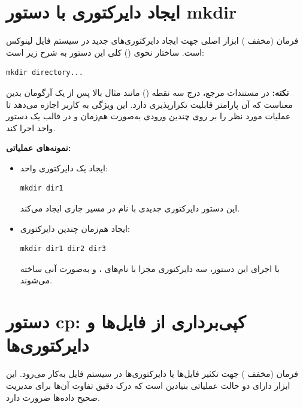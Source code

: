 \section{ایجاد دایرکتوری با دستور mkdir}

فرمان  (مخفف ) ابزار اصلی جهت ایجاد دایرکتوری‌های جدید در سیستم‌ فایل لینوکس است. ساختار نحوی () کلی این دستور به شرح زیر است:

\begin{latin}
\begin{lstlisting}
mkdir directory...
\end{lstlisting}
\end{latin}

\begin{note}
\textbf{نکته:} در مستندات مرجع، درج سه نقطه () مانند مثال بالا پس از یک آرگومان بدین معناست که آن پارامتر قابلیت تکرارپذیری دارد. این ویژگی به کاربر اجازه می‌دهد تا عملیات مورد نظر را بر روی چندین ورودی به‌صورت هم‌زمان و در قالب یک دستور واحد اجرا کند.
\end{note}

\textbf{نمونه‌های عملیاتی:}

\begin{itemize}
  \item ایجاد یک دایرکتوری واحد:
\begin{latin}
\begin{lstlisting}
mkdir dir1
\end{lstlisting}
\end{latin}
این دستور دایرکتوری جدیدی با نام  در مسیر جاری ایجاد می‌کند.

  \item ایجاد هم‌زمان چندین دایرکتوری:
\begin{latin}
\begin{lstlisting}
mkdir dir1 dir2 dir3
\end{lstlisting}
\end{latin}
با اجرای این دستور، سه دایرکتوری مجزا با نام‌های ،  و  به‌صورت آنی ساخته می‌شوند.
\end{itemize}

\section{دستور cp: کپی‌برداری از فایل‌ها و دایرکتوری‌ها}

فرمان  (مخفف ) جهت تکثیر فایل‌ها یا دایرکتوری‌ها در سیستم‌ فایل به‌کار می‌رود. این ابزار دارای دو حالت عملیاتی بنیادین است که درک دقیق تفاوت آن‌ها برای مدیریت صحیح داده‌ها ضرورت دارد.

